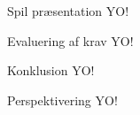 \begin{frame}{Spil præsentation}
  YO!  
\end{frame}

\begin{frame}{Evaluering af krav}
 YO!
\end{frame}

\begin{frame}{Konklusion}
 YO!
\end{frame}

\begin{frame}{Perspektivering}
  YO!
\end{frame}
